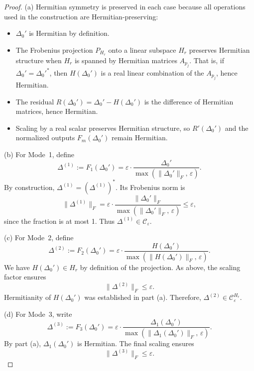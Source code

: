 \documentclass[11pt]{article}
\begin{document}
\begin{proof}
(a) Hermitian symmetry is preserved in each case because all operations used in the construction are Hermitian-preserving:

\begin{itemize}
  \item \( \Delta_0' \) is Hermitian by definition.
  \item The Frobenius projection \( P_{H_r} \) onto a linear subspace \( H_r \) preserves Hermitian structure when \( H_r \) is spanned by Hermitian matrices \( A_{p_j} \). That is, if \( \Delta_0' = \Delta_0'^* \), then \( H(\Delta_0') \) is a real linear combination of the \( A_{p_j} \), hence Hermitian.
  \item The residual \( R(\Delta_0') = \Delta_0' - H(\Delta_0') \) is the difference of Hermitian matrices, hence Hermitian.
  \item Scaling by a real scalar preserves Hermitian structure, so \( R'(\Delta_0') \) and the normalized outputs \( F_m(\Delta_0') \) remain Hermitian.
\end{itemize}

(b) For Mode~1, define
\[
\Delta^{(1)} := F_1(\Delta_0') = \varepsilon \cdot \frac{\Delta_0'}{\max(\|\Delta_0'\|_F,\,\varepsilon)}.
\]
By construction, \( \Delta^{(1)} = (\Delta^{(1)})^* \). Its Frobenius norm is
\[
\|\Delta^{(1)}\|_F
  = \varepsilon \cdot \frac{\|\Delta_0'\|_F}{\max(\|\Delta_0'\|_F,\,\varepsilon)}
  \le \varepsilon,
\]
since the fraction is at most 1. Thus \( \Delta^{(1)} \in \mathcal{C}_\varepsilon \).

(c) For Mode~2, define
\[
\Delta^{(2)} := F_2(\Delta_0') = \varepsilon \cdot \frac{H(\Delta_0')}{\max(\|H(\Delta_0')\|_F,\,\varepsilon)}.
\]
We have \( H(\Delta_0') \in H_r \) by definition of the projection. As above, the scaling factor ensures
\[
\|\Delta^{(2)}\|_F \le \varepsilon.
\]
Hermitianity of \( H(\Delta_0') \) was established in part (a). Therefore, \( \Delta^{(2)} \in \mathcal{C}_\varepsilon^{H_r} \).

(d) For Mode~3, write
\[
\Delta^{(3)} := F_3(\Delta_0') = \varepsilon \cdot \frac{\Delta_1(\Delta_0')}{\max(\|\Delta_1(\Delta_0')\|_F,\,\varepsilon)}.
\]
By part (a), \( \Delta_1(\Delta_0') \) is Hermitian. The final scaling ensures
\[
\|\Delta^{(3)}\|_F \le \varepsilon.
\]


\end{proof}
\end{document}
